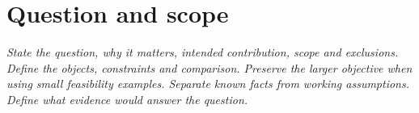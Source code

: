\section{Question and scope}
\label{sec:question}
\emph{State the question, why it matters, intended contribution, scope and exclusions.
Define the objects, constraints and comparison. Preserve the larger objective
when using small feasibility examples.
Separate known facts from working assumptions. Define what evidence would
answer the question.}
